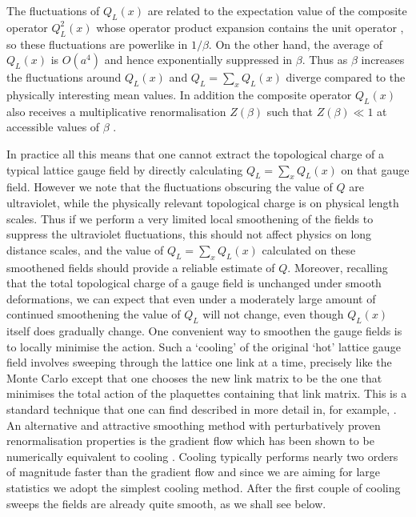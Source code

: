\documentclass[12pt]{article}
\begin{document}
The fluctuations of $Q_L(x)$ are related to the expectation value of the composite operator
$Q_L^2(x)$ whose operator product expansion contains the unit operator
\cite{DiVecchia-FFD},
so these fluctuations are powerlike in $1/\beta$. On the other hand, the average of
$Q_L(x)$ is $O(a^4)$ and
hence exponentially suppressed in $\beta$. Thus as $\beta$ increases the fluctuations
around $Q_L(x)$ and $Q_L=\sum_x Q_L(x)$ diverge compared to the physically interesting
mean values. In addition the composite operator $Q_L(x)$ also receives a multiplicative
renormalisation $Z(\beta)$ such that $Z(\beta) \ll 1$  at accessible values of $\beta$
\cite{Pisa_ZQ}.

In practice all this means that one cannot extract the topological charge of a typical lattice
gauge field by directly calculating $Q_L=\sum_x Q_L(x)$ on that gauge field. However we note that
the fluctuations obscuring the value of $Q$ are ultraviolet, while the physically relevant
topological charge is on physical length scales. Thus if we perform a very limited local smoothening
of the fields to suppress the ultraviolet fluctuations, this should not affect physics
on long distance scales, and the value of $Q_L=\sum_x Q_L(x)$ calculated on these smoothened
fields should provide a reliable estimate of $Q$. Moreover, recalling that the total
topological charge of a gauge field is unchanged under smooth deformations, we can expect
that even under a moderately large amount of continued smoothening the value of  $Q_L$ will not
change, even though $Q_L(x)$ itself does gradually change. One convenient way to smoothen the
gauge fields is to locally minimise the action. Such a `cooling' of the original `hot'
lattice gauge field
\cite{MT-cool}
involves sweeping through the lattice one link at a time, precisely like the Monte Carlo
except that one chooses the new link matrix to be the one that minimises the total
action of the plaquettes containing that link matrix. This is a standard technique
that one can find described in more detail in, for example,
\cite{DSMT-Q}.
An alternative and attractive smoothing method with perturbatively proven
renormalisation properties is the gradient flow
%
\cite{Luscher:2010iy,Luscher:2011bx,Luscher:2013vga}
%
which has been shown to be numerically equivalent to cooling
%
\cite{Bonati:2014tqa,Alexandrou:2015yba,Alexandrou:2017hqw}.
%
Cooling typically performs nearly two orders of magnitude faster than the gradient flow and
since we are aiming for large statistics we adopt the simplest cooling method.
After the first couple of cooling sweeps the fields are already quite smooth, as we shall see below.
\end{document}
